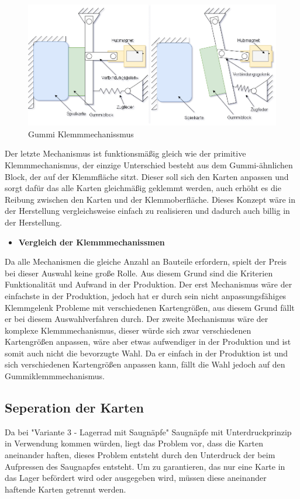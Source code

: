 \begin{figure}[H]
    \centering
    \includegraphics[scale=0.5,page=1]{fig/mech/Kartenausgabe_3}
    \caption{Gummi Klemmmechanissmus}
\end{figure}

Der letzte Mechanismus ist funktionsmäßig gleich wie der primitive Klemmmechanismus, der einzige Unterschied besteht aus dem
Gummi-ähnlichen Block, der auf der Klemmfläche sitzt. Dieser soll sich den Karten anpassen und sorgt dafür das alle Karten gleichmäßig
geklemmt werden, auch erhöht es die Reibung zwischen den Karten und der Klemmoberfläche. Dieses Konzept wäre in der Herstellung vergleichsweise
einfach zu realisieren und dadurch auch billig in der Herstellung.


\begin{itemize}
    \item \textbf{Vergleich der Klemmmechanissmen}
\end{itemize}

Da alle Mechanismen die gleiche Anzahl an Bauteile erfordern, spielt der Preis bei dieser Auswahl keine große Rolle. Aus diesem Grund
sind die Kriterien Funktionalität und Aufwand in der Produktion. Der erst Mechanismus wäre der einfachste in der Produktion, jedoch
hat er durch sein nicht anpassungsfähiges Klemmgelenk Probleme mit verschiedenen Kartengrößen, aus diesem Grund fällt er bei diesem Auswahlverfahren durch.
Der zweite Mechanismus wäre der komplexe Klemmmechanismus, dieser würde sich zwar verschiedenen Kartengrößen anpassen, wäre aber etwas aufwendiger in der
Produktion und ist somit auch nicht die bevorzugte Wahl. Da er einfach in der Produktion ist und sich verschiedenen Kartengrößen anpassen kann, fällt die Wahl jedoch auf den Gummiklemmmechanismus.

\subsection{Seperation der Karten}
Da bei "Variante 3 - Lagerrad mit Saugnäpfe" Saugnäpfe mit Unterdruckprinzip in Verwendung kommen würden, liegt das Problem vor,
dass die Karten aneinander haften, dieses Problem entsteht durch den Unterdruck der beim Aufpressen des Saugnapfes entsteht.
Um zu garantieren, das nur eine Karte in das Lager befördert wird oder ausgegeben wird, müssen diese aneinander
haftende Karten getrennt werden.


